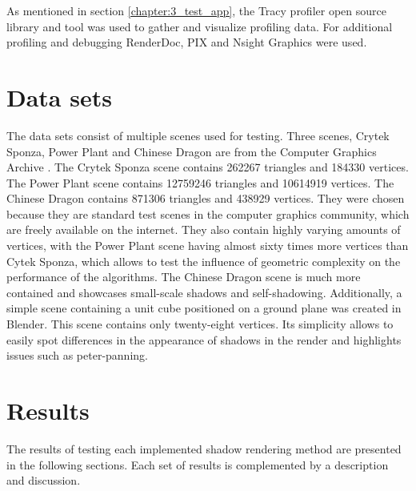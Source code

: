 As mentioned in section \ref{chapter:3_test_app}, the Tracy profiler open source library and tool was used to gather and visualize profiling data. For additional profiling and debugging RenderDoc, PIX and Nsight Graphics were used.

\section{Data sets}
The data sets consist of multiple scenes used for testing. Three scenes, Crytek Sponza, Power Plant and Chinese Dragon are from the Computer Graphics Archive \cite{bib:internet:test_scenes}. The Crytek Sponza scene contains 262267 triangles and 184330 vertices. The Power Plant scene contains 12759246 triangles and 10614919 vertices. The Chinese Dragon contains 871306 triangles and 438929 vertices. They were chosen because they are standard test scenes in the computer graphics community, which are freely available on the internet. They also contain highly varying amounts of vertices, with the Power Plant scene having almost sixty times more vertices than Cytek Sponza, which allows to test the influence of geometric complexity on the performance of the algorithms. The Chinese Dragon scene is much more contained and showcases small-scale shadows and self-shadowing. Additionally, a simple scene containing a unit cube positioned on a ground plane was created in Blender. This scene contains only twenty-eight vertices. Its simplicity allows to easily spot differences in the appearance of shadows in the render and highlights issues such as peter-panning.

\section{Results}

The results of testing each implemented shadow rendering method are presented in the following sections. Each set of results is complemented by a description and discussion.


